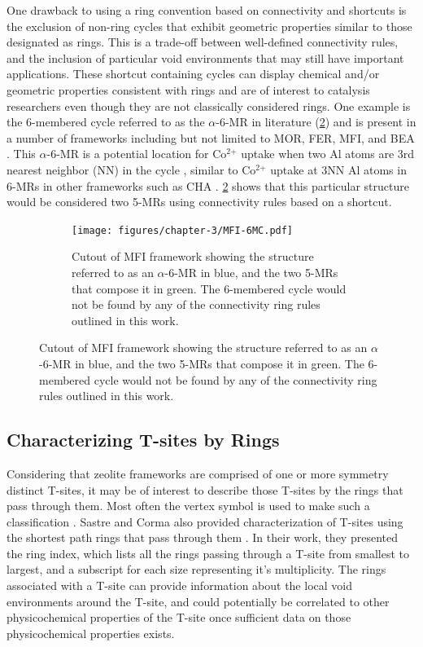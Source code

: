 \documentclass[preprint,numrefs,noinfo,sort&compress]{elsarticle}
\begin{document}
One drawback to using a ring convention based on connectivity and shortcuts is the exclusion of non-ring cycles that exhibit geometric properties similar to those designated as rings. This is a trade-off between well-defined connectivity rules, and the inclusion of particular void environments that may still have important applications. These shortcut containing cycles can display chemical and/or geometric properties consistent with rings and are of interest to catalysis researchers even though they are not classically considered rings. One example is the 6-membered cycle referred to as the \(\alpha\)-6-MR in literature (\cref{fig:mfi-6}) and is present in a number of frameworks including but not limited to MOR, FER, MFI, and BEA \cite{dedecek-siting-2012,bernauer-proton-2016}. This \(\alpha\)-6-MR is a potential location for Co\(^{\text{2+}}\) uptake when two Al atoms are 3rd nearest neighbor (NN) in the cycle  \cite{bernauer-proton-2016,nimlos-experimental-2020}, similar to Co\(^{\text{2+}}\) uptake at 3NN Al atoms in 6-MRs in other frameworks such as CHA \cite{di-iorio-cooperative-2020}. \cref{fig:mfi-6} shows that this particular structure would be considered two 5-MRs using connectivity rules based on a shortcut. 

\begin{figure}
\begin{figure}[H]
\centering
\texttt{[image: figures/chapter-3/MFI-6MC.pdf]}
\caption{Cutout of MFI framework showing the structure referred to as an \(\alpha\)-6-MR in blue, and the two 5-MRs that compose it in green. The 6-membered cycle would not be found by any of the connectivity ring rules outlined in this work. \label{fig:mfi-6}}
\end{figure}
\end{figure}

\subsection{Characterizing T-sites by Rings}
\label{sec:org6b7283b}

Considering that zeolite frameworks are comprised of one or more symmetry distinct T-sites, it may be of interest to describe those T-sites by the rings that pass through them. Most often the vertex symbol is used to make such a classification \cite{okeeffe-vertex-1997}. Sastre and Corma also provided characterization of T-sites using the shortest path rings that pass through them \cite{sastre-topological-2009}. In their work, they presented the ring index, which lists all the rings passing through a T-site from smallest to largest, and a subscript for each size representing it's multiplicity.  The rings associated with a T-site can provide information about the local void environments around the T-site, and could potentially be correlated to other physicochemical properties of the T-site once sufficient data on those physicochemical properties exists. 
\end{document}
